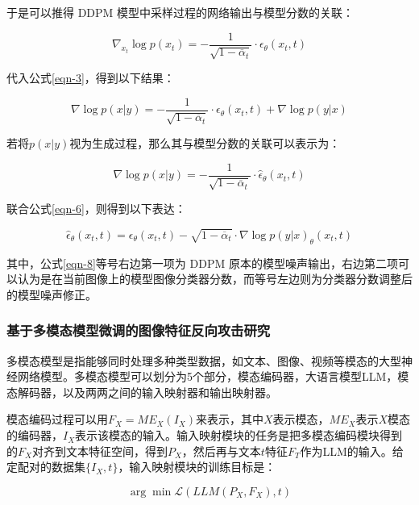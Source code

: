 于是可以推得 DDPM 模型中采样过程的网络输出与模型分数的关联：

\begin{equation}\label{eqn-5}
      \nabla_{x_t} \log p(x_t) = - \frac{1}{\sqrt{1-\overline{\alpha}_t}} \cdot\epsilon_\theta(x_t,t)
\end{equation}

代入公式\eqref{eqn-3}，得到以下结果：

\begin{equation}\label{eqn-6}
      \nabla \log p(x|y) = - \frac{1}{\sqrt{1-\overline{\alpha}_t}} \cdot\epsilon_\theta(x_t,t)
      + \nabla \log p(y|x)
\end{equation}

若将$p(x|y)$视为生成过程，那么其与模型分数的关联可以表示为：

\begin{equation}\label{eqn-7}
      \nabla \log p(x|y) = - \frac{1}{\sqrt{1-\overline{\alpha}_t}} \cdot\hat{\epsilon}_\theta(x_t,t)
\end{equation}

联合公式\eqref{eqn-6}，则得到以下表达：

\begin{equation}\label{eqn-8}
      \hat{\epsilon}_\theta(x_t,t) = \epsilon_\theta(x_t,t) -\sqrt{1-\overline{\alpha}_t} \cdot \nabla \log p(y|x)_\theta(x_t,t)
\end{equation}

其中，公式\eqref{eqn-8}等号右边第一项为 DDPM 原本的模型噪声输出，右边第二项可以认为是在当前图像上的模型图像分类器分数，而等号左边则为分类器分数调整后的模型噪声修正。

\subsubsection{基于多模态模型微调的图像特征反向攻击研究}
多模态模型是指能够同时处理多种类型数据，如文本、图像、视频等模态的大型神经网络模型。多模态模型可以划分为5个部分，模态编码器，大语言模型LLM，模态解码器，以及两两之间的输入映射器和输出映射器。
\par
模态编码过程可以用$F_X = ME_X(I_X)$来表示，其中$X$表示模态，$ME_X$表示$X$模态的编码器，$I_X$表示该模态的输入。输入映射模块的任务是把多模态编码模块得到的$F_X$对齐到文本特征空间，得到$P_X$，然后再与文本$t$特征$F_T$作为LLM的输入。给定配对的数据集$\{I_X,t\}$，输入映射模块的训练目标是：

\begin{equation}\label{eqn-9}
      \arg \min \mathcal{L}(LLM(P_X,F_X),t)
\end{equation}

